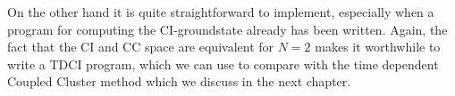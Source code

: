 \documentclass[aip,jcp,reprint,floatfix]{revtex4-1}
\begin{document}
On the other hand it is quite straightforward to implement, especially
when a program for computing the CI-groundstate already has been
written.  Again, the fact that the CI and CC space are equivalent for
$N=2$ makes it worthwhile to write a TDCI program, which we can use to
compare with the time dependent Coupled Cluster method which we
discuss in the next chapter.
\begin{comment}
\subsection{Coupled cluster theory}
In this section we review Coupled Cluster (CC) theory.  We will look
at the "classical" way of obtaining the CC equations. The presentation
borrows heavily from the excellent review by Crawford and
Schaefer\cite{Crawford2000}.

Furthermore we look at a different approach which in addition to the
usual CC equations also gives a method to solve the time dependent
Schrödinger equation, the so-called Orbital Adaptive Coupled Cluster
(OATDCC) method\cite{Kvaal12}.

\subsubsection{The exponential ansatz}
As usual we start by considering the time-independent Schrödinger equation
\begin{equation*}
\hat{H} \ket{\Psi} = E\ket{\Psi}.
\end{equation*}
In Coupled Cluster theory an exponential ansatz 
\begin{equation}
\ket{\Psi}_{CC} \equiv e^{\hat{T}} \ket{\Phi} \label{ExponantialAnsatzCC},
\end{equation}
is used to approximate the exact solution. Here $\ket{\Phi}$ is a
reference Slater determinant and $\hat{T} = \sum_{i}^n \hat{T}_i$ is
the sum over n-orbital cluster operators.

The the one- and two-orbital cluster operators are defined as
\begin{equation}
\hat{T}_1 \equiv \sum_{ia} t_i^a c_a^\dagger c_i
\end{equation}
and 
\begin{equation}
\hat{T}_2 \equiv \frac{1}{4} \sum_{ijab} t_{ij}^{ab} c_b^\dagger c_j c_a^\dagger c_i.
\end{equation}
Generally an n-orbital cluster operator is defined as 
\begin{equation}
\hat{T}_n \equiv \left(\frac{1}{n!}\right)^2 \sum_{ijk...abc...}t_{ijk...}^{abc...} ...c_c^\dagger c_k c_b^\dagger c_j c_a^\dagger   c_i.
\end{equation}
Recalling the exponential series we can write,
\begin{equation}
 \ket{\Psi}_{CC} = e^{\hat{T}} \ket{\Phi} = \left( 1+\sum_{k=1}^\infty \frac{1}{k!}\hat{T}^k \right) \ket{\Phi}. \label{CCansatzSeriesExpansion}
\end{equation}


\end{comment}
\end{document}
